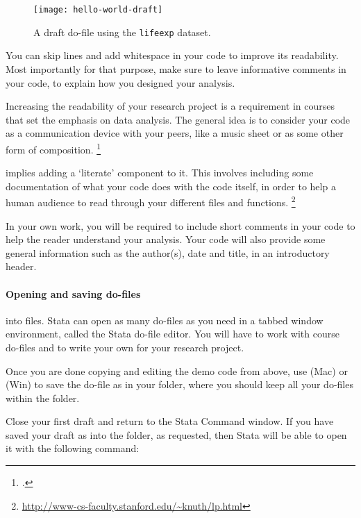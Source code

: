 \begin{figure}%
  \texttt{[image: hello-world-draft]}%
  \caption{A draft do-file using the \texttt{lifeexp} dataset.}%
  \label{fig:hello-world-draft}%
\end{figure}


%
 You can skip lines and add whitespace in your code to improve its readability. Most importantly for that purpose, make sure to leave informative comments in your code, to explain how you designed your analysis.%

Increasing the readability of your research project is a requirement in courses that set the emphasis on data analysis. The general idea is to consider your code as a communication device with your peers, like a music sheet or as some other form of composition.%
  \footcite{WickhamGrolemund:2013} %

%
 implies adding a `literate' component to it. This involves including some documentation of what your code does with the code itself, in order to help a human audience to read through your different files and functions.%
  \footnote{\url{http://www-cs-faculty.stanford.edu/~knuth/lp.html}} %

In your own work, you will be required to include short comments in your code to help the reader understand your analysis. Your code will also provide some general information such as the author(s), date and title, in an introductory header.%

\paragraph{Opening and saving do-files}

 into  files. Stata can open as many do-files as you need in a tabbed window environment, called the Stata do-file editor. You will have to work with course do-files and to write your own for your research project.%

Once you are done copying and editing the demo code from above, use  (Mac) or  (Win) to save the do-file as  in your \code folder, where you should keep all your do-files within the \SRQM folder.%

Close your first draft and return to the Stata Command window. If you have saved your draft as  into the \code folder, as requested, then Stata will be able to open it with the following command:%


